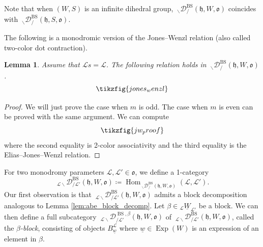 \documentclass{amsart}
\newcommand{\scrL}{\mathcal{L}}
\DeclareMathOperator{\Hom}{Hom}
\newcommand{\fr}[1]{\mathfrak{#1}}
\DeclareMathOperator{\BS}{BS}
\newcommand{\EWmon}[2]{\:_{#1 \backslash} \mathcal{D}_{/ #2} }
\DeclareMathOperator{\Exp}{Exp}
\newcommand{\uW}[2]{{}_{#1}\underline{W}_{#2}}
\newcommand{\uw}{\underline{w}}
\newtheorem{lemma}[subsubsection]{Lemma}
\theoremstyle{definition}
\numberwithin{equation}{subsection}
\begin{document}
Note that when $(W,S)$ is an infinite dihedral group, $\EWmon{}{}^{\BS} (\fr{h}, W, \fr{o})$ coincides with $\EWmon{}{}^{\BS} (\fr{h}, S, \fr{o})$.

The following is a monodromic version of the Jones--Wenzl relation (also called two-color dot contraction).
\begin{lemma}\label{lem:jones_wenzl}
    Assume that $\scrL s = \scrL$. The following relation holds in $\EWmon{}{}^{\BS} (\fr{h}, W, \fr{o})$.
    \begin{equation}
        \tikzfig{jones_wenzl}
    \end{equation}
\end{lemma}
\begin{proof}
    We will just prove the case when $m$ is odd. The case when $m$ is even can be proved with the same argument.
    We can compute
    \[\tikzfig{jw_proof}\]
    where the second equality is 2-color associativity and the third equality is the Elias--Jones--Wenzl relation.
\end{proof}

For two monodromy parameters $\scrL, \scrL' \in \fr{o}$, we define a 1-category 
\[ \EWmon{\scrL}{\scrL'}^{\BS} (\fr{h}, W, \fr{o}) \coloneq \Hom_{\EWmon{}{}^{\BS} (\fr{h}, W, \fr{o})} (\scrL, \scrL'). \]
Our first observation is that $\EWmon{\scrL}{\scrL'}^{\BS} (\fr{h}, W, \fr{o})$ admits a block decomposition analogous to Lemma \ref{lem:abe_block_decomp}.
Let $\beta \in \uW{\scrL}{\scrL'}$ be a block. We can then define a full subcategory $\EWmon{\scrL}{\scrL'}^{\BS, \beta} (\fr{h}, W, \fr{o})$ of $\EWmon{\scrL}{\scrL'}^{\BS} (\fr{h}, W, \fr{o})$, called the \emph{$\beta$-block},  consisting of objects $B_{\uw}^{\scrL}$ where $\uw \in \Exp (W)$ is an expression of an element in $\beta$.
\end{document}
